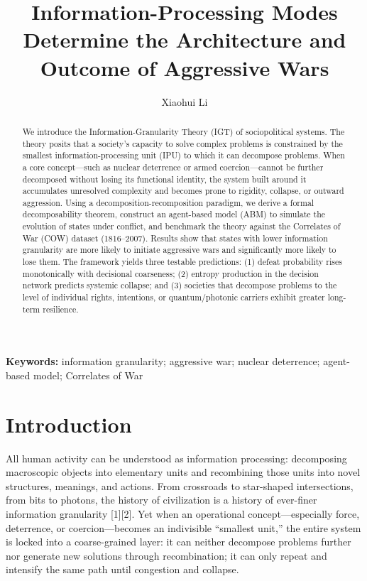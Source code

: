 \documentclass[11pt,a4paper]{article}
\title{\textbf{Information-Processing Modes Determine the Architecture and Outcome of Aggressive Wars}}
\author{Xiaohui Li}
\affil{Independent Researcher, Baoji, China\\Correspondence: \texttt{danceluck@163.com}\\ORCID: 0009-0003-8233-7191\\Data homepage: \url{https://github.com/xiaohui-li-lab/}}
\date{}
\begin{document}
\maketitle

\begin{abstract}
\noindent
We introduce the Information-Granularity Theory (IGT) of sociopolitical systems. The theory posits that a society's capacity to solve complex problems is constrained by the smallest information-processing unit (IPU) to which it can decompose problems. When a core concept---such as nuclear deterrence or armed coercion---cannot be further decomposed without losing its functional identity, the system built around it accumulates unresolved complexity and becomes prone to rigidity, collapse, or outward aggression. Using a decomposition-recomposition paradigm, we derive a formal decomposability theorem, construct an agent-based model (ABM) to simulate the evolution of states under conflict, and benchmark the theory against the Correlates of War (COW) dataset (1816--2007). Results show that states with lower information granularity are more likely to initiate aggressive wars and significantly more likely to lose them. The framework yields three testable predictions: (1) defeat probability rises monotonically with decisional coarseness; (2) entropy production in the decision network predicts systemic collapse; and (3) societies that decompose problems to the level of individual rights, intentions, or quantum/photonic carriers exhibit greater long-term resilience.
\end{abstract}

\noindent\textbf{Keywords:} information granularity; aggressive war; nuclear deterrence; agent-based model; Correlates of War

\section{Introduction}

All human activity can be understood as information processing: decomposing macroscopic objects into elementary units and recombining those units into novel structures, meanings, and actions. From crossroads to star-shaped intersections, from bits to photons, the history of civilization is a history of ever-finer information granularity [1][2]. Yet when an operational concept---especially force, deterrence, or coercion---becomes an indivisible ``smallest unit,'' the entire system is locked into a coarse-grained layer: it can neither decompose problems further nor generate new solutions through recombination; it can only repeat and intensify the same path until congestion and collapse.
\end{document}
